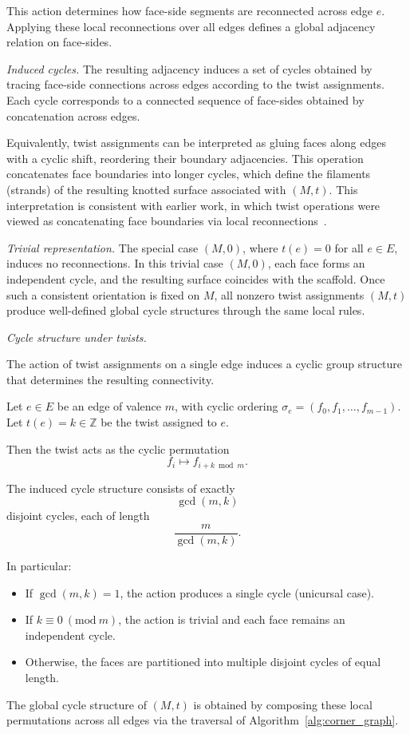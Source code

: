 \documentclass[acmtog]{acmart}
\begin{document}
This action determines how face-side segments are reconnected across edge $e$. Applying these local reconnections over all edges defines a global adjacency relation on face-sides.

\textit{Induced cycles.}
The resulting adjacency induces a set of cycles obtained by tracing face-side connections across edges according to the twist assignments. Each cycle corresponds to a connected sequence of face-sides obtained by concatenation across edges.

Equivalently, twist assignments can be interpreted as gluing faces 
along edges with a cyclic shift, reordering their boundary adjacencies. 
This operation concatenates face boundaries into longer cycles, which 
define the filaments (strands) of the resulting knotted surface associated with $(M, t)$.
This interpretation is consistent with earlier work, in which twist operations were viewed as concatenating face boundaries via local reconnections~\cite{akleman2009cyclic,akleman2015extended,akleman2020topologically,akleman2015blockmeshes}.



\textit{Trivial representation.}
The special case $(M, 0)$, where $t(e) = 0$ for all $e \in E$, induces no reconnections. In this trivial case $(M,0)$, each face forms an independent cycle, and the resulting surface coincides with the scaffold.  Once such a consistent orientation is fixed on $M$, all nonzero twist assignments $(M,t)$ produce well-defined global cycle structures through
the same local rules.

\textit{Cycle structure under twists.}

The action of twist assignments on a single edge induces a cyclic
group structure that determines the resulting connectivity.

\begin{theorem}
\label{theo:twist}
Let $e \in E$ be an edge of valence $m$, with cyclic ordering
$\sigma_e = (f_0, f_1, \ldots, f_{m-1})$. Let $t(e) = k \in \mathbb{Z}$
be the twist assigned to $e$.

Then the twist acts as the cyclic permutation
\[
f_i \mapsto f_{i+k \bmod m}.
\]

The induced cycle structure consists of exactly
\[
\gcd(m, k)
\]
disjoint cycles, each of length
\[
\frac{m}{\gcd(m, k)}.
\]

In particular:
\begin{itemize}
\item If $\gcd(m, k) = 1$, the action produces a single cycle
(unicursal case).
\item If $k \equiv 0 \ (\mathrm{mod}\ m)$, the action is trivial and
each face remains an independent cycle.
\item Otherwise, the faces are partitioned into multiple disjoint
cycles of equal length.
\end{itemize}
The global cycle structure of $(M,t)$ is obtained by composing these local permutations across all edges via the traversal of Algorithm~\ref{alg:corner_graph}.
\end{theorem}
\end{document}
